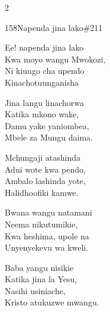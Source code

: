\documentclass{article}
\begin{document}
\begin{multicols}{2}
\begin{hymn}{158}{Napenda jina lako}{\#211}
\begin{stanza}
Ee! napenda jina lako\\
Kwa moyo wangu Mwokozi,\\
Ni kiungo cha upendo\\
Kinachotuunganisha
\end{stanza}
\begin{chorus}
Jina langu linachorwa\\
Katika mkono wake,\\
Damu yake yaniombea,\\
Mbele za Mungu daima.
\end{chorus}
\begin{stanza}
Mchungaji atashinda\\
Adui wote kwa pendo,\\
Ambalo lashinda yote,\\
Halidhoofiki kamwe.
\end{stanza}
\begin{stanza}
Bwana wangu natamani\\
Neema nikutumikie,\\
Kwa heshima, upole na\\
Unyenyekevu wa kweli.
\end{stanza}
\begin{stanza}
Baba yangu nisikie\\
Katika jina la Yesu,\\
Nasihi usiniache,\\
Kristo atukuzwe mwangu.
\end{stanza}
\end{hymn}


\end{multicols}
\end{document}
